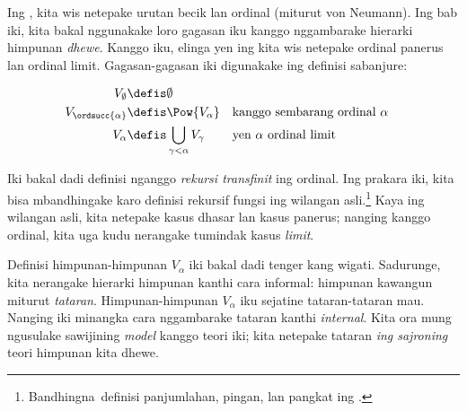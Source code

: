 \documentclass[../../../include/open-logic-section]{subfiles}
\begin{document}


Ing , kita wis netepake
urutan becik lan ordinal (miturut von Neumann).
Ing bab iki, kita bakal nggunakake loro gagasan iku
kanggo nggambarake hierarki himpunan \emph{dhewe}.
Kanggo iku, elinga yen ing
 kita wis netepake
ordinal panerus lan ordinal limit. Gagasan-gagasan
iki digunakake ing definisi sabanjure:

\begin{defn}
	\begin{align*}
	V_\emptyset &\defis \emptyset\\
	V_{\ordsucc{\alpha}} &\defis \Pow{V_\alpha} & & 
	\text{kanggo sembarang ordinal }\alpha\\
	V_{\alpha} &\defis \bigcup_{\gamma < \alpha} V_\gamma & & 
	\text{yen }\alpha\text{ ordinal limit}
\end{align*}
\end{defn}
\noindent
Iki bakal dadi definisi nganggo \emph{rekursi
transfinit} ing ordinal. Ing prakara iki, kita bisa
mbandhingake karo definisi rekursif fungsi ing
wilangan asli.\footnote{Bandhingna\ definisi
panjumlahan, pingan, lan pangkat ing
.} Kaya ing
wilangan asli, kita netepake kasus dhasar lan kasus
panerus; nanging kanggo ordinal, kita uga kudu
nerangake tumindak kasus \emph{limit}.

Definisi himpunan-himpunan $V_\alpha$ iki bakal dadi
tenger kang wigati. Sadurunge, kita nerangake
hierarki himpunan kanthi cara informal: himpunan
kawangun miturut \emph{tataran}. Himpunan-himpunan
$V_\alpha$ iku sejatine tataran-tataran mau.
Nanging iki minangka cara nggambarake tataran kanthi
\emph{internal}. Kita ora mung ngusulake sawijining
\emph{model} kanggo teori iki; kita
netepake tataran \emph{ing sajroning} teori himpunan
kita dhewe.
\end{document}
